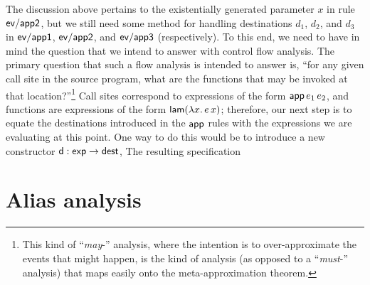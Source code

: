 The discussion above pertains to the existentially generated parameter
$x$ in rule ${\sf ev/app2}$, but we still need some method for
handling destinations $d_1$, $d_2$, and $d_3$ in ${\sf ev/app1}$,
${\sf ev/app2}$, and ${\sf ev/app3}$ (respectively). To this end, we
need to have in mind the question that we intend to answer with
control flow analysis. The primary question that such a flow analysis
is intended to answer is, ``for any given call site in the source
program, what are the functions that may be invoked at that
location?''\footnote{This kind of ``{\it may}-'' analysis, where the
  intention is to over-approximate the events that might happen, is
  the kind of analysis (as opposed to a ``{\it must}-'' analysis) that
  maps easily onto the meta-approximation theorem.} Call sites
correspond to expressions of the form ${\sf app}\,e_1\,e_2$, and
functions are expressions of the form ${\sf lam}(\lambda x.\,e\,x)$;
therefore, our next step is to equate the destinations introduced
in the ${\sf app}$ rules with the expressions we are evaluating 
at this point. One way to do this would be to introduce a new constructor
${\sf d}: {\sf exp} \rightarrow {\sf dest}$,  The resulting specification 


\section{Alias analysis}
